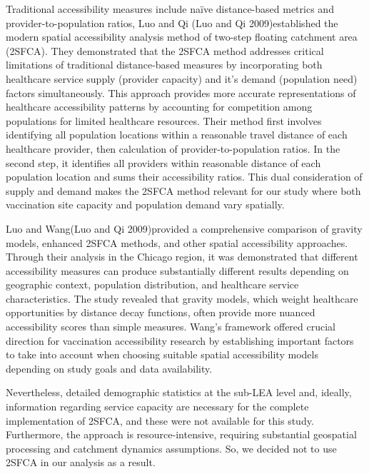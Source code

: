 \documentclass{article}
\begin{document}
Traditional accessibility measures include naïve distance-based metrics
and provider-to-population ratios, Luo and Qi (Luo and Qi
2009)established the modern spatial accessibility analysis method of
two-step floating catchment area (2SFCA). They demonstrated that the
2SFCA method addresses critical limitations of traditional
distance-based measures by incorporating both healthcare service supply
(provider capacity) and it's demand (population need) factors
simultaneously. This approach provides more accurate representations of
healthcare accessibility patterns by accounting for competition among
populations for limited healthcare resources. Their method first
involves identifying all population locations within a reasonable travel
distance of each healthcare provider, then calculation of
provider-to-population ratios. In the second step, it identifies all
providers within reasonable distance of each population location and
sums their accessibility ratios. This dual consideration of supply and
demand makes the 2SFCA method relevant for our study where both
vaccination site capacity and population demand vary spatially.

Luo and Wang(Luo and Qi 2009)provided a comprehensive comparison of
gravity models, enhanced 2SFCA methods, and other spatial accessibility
approaches. Through their analysis in the Chicago region, it was
demonstrated that different accessibility measures can produce
substantially different results depending on geographic context,
population distribution, and healthcare service characteristics. The
study revealed that gravity models, which weight healthcare
opportunities by distance decay functions, often provide more nuanced
accessibility scores than simple measures. Wang's framework offered
crucial direction for vaccination accessibility research by establishing
important factors to take into account when choosing suitable spatial
accessibility models depending on study goals and data availability.

Nevertheless, detailed demographic statistics at the sub-LEA level and,
ideally, information regarding service capacity are necessary for the
complete implementation of 2SFCA, and these were not available for this
study. Furthermore, the approach is resource-intensive, requiring
substantial geospatial processing and catchment dynamics assumptions.
So, we decided not to use 2SFCA in our analysis as a result.
\end{document}
